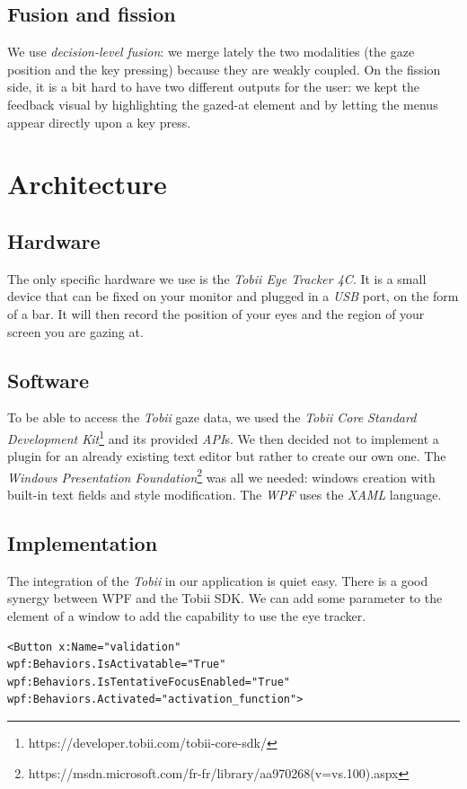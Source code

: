 \documentclass[12pt, a4paper, twoside]{article}
\begin{document}
\subsection{Fusion and fission}
We use \textit{decision-level fusion}: we merge lately the two modalities (the gaze position and the key pressing) because they are weakly coupled. On the fission side, it is a bit hard to have two different outputs for the user: we kept the feedback visual by highlighting the gazed-at element and by letting the menus appear directly upon a key press.  

\section{Architecture}

\subsection{Hardware}
The only specific hardware we use is the \textit{Tobii Eye Tracker 4C}. It is a small device that can be fixed on your monitor and plugged in a \textit{USB} port, on the form of a bar. It will then record the position of your eyes and the region of your screen you are gazing at. 

\subsection{Software}
To be able to access the \textit{Tobii} gaze data, we used the \textit{Tobii Core Standard Development Kit}\footnote{https://developer.tobii.com/tobii-core-sdk/} and its provided \textit{API}s. We then decided not to implement a plugin for an already existing text editor but rather to create our own one. The \textit{Windows Presentation Foundation}\footnote{https://msdn.microsoft.com/fr-fr/library/aa970268(v=vs.100).aspx} was all we needed: windows creation with built-in text fields and style modification. The \textit{WPF} uses the \textit{XAML} language. 

\subsection{Implementation}
The integration of the \textit{Tobii} in our application is quiet easy. There is a good synergy between WPF and the Tobii SDK. We can add some parameter to the element of a window to add the capability to use the eye tracker.

\begin{lstlisting}
<Button x:Name="validation"
wpf:Behaviors.IsActivatable="True"
wpf:Behaviors.IsTentativeFocusEnabled="True"
wpf:Behaviors.Activated="activation_function">
\end{lstlisting}
\end{document}
